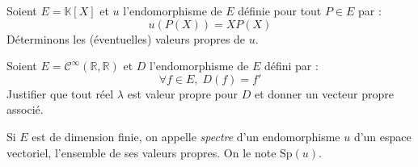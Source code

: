 \documentclass[french,11pt,twoside]{VcCours}
\begin{document}
%
%
%

\begin{Exemple}{} Soient $E = \mathbb{K}[X]$ et $u$ l'endomorphisme de $E$ définie pour tout $P \in E$ par :
$$ u(P(X))= XP(X)$$
Déterminons les (éventuelles) valeurs propres de $u$. 

\vspace{3cm}
%
%
\end{Exemple}

\begin{ApplicationDirecte}{} Soient $E= \mathcal{C}^{\infty}(\mathbb{R}, \mathbb{R})$ et $D$ l'endomorphisme de $E$ défini par :
$$ \forall f \in E, \; D(f)=f'$$
Justifier que tout réel $\lambda$ est valeur propre pour $D$ et donner un vecteur propre associé.
\end{ApplicationDirecte}

\begin{Definition}{} Si $E$ est de dimension finie, on appelle \emph{spectre} d'un endomorphisme $u$ d'un espace vectoriel, l'ensemble de ses valeurs propres. On le note $\textrm{Sp}(u)$.
\end{Definition}
\end{document}
